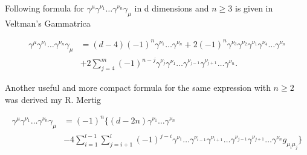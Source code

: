 \documentclass[../FeynCalcManual.tex]{subfiles}
\begin{document}
Following formula for
\(\gamma^\mu \gamma^{\nu_1} \dots \gamma^{\nu_n} \gamma_\mu\) in d
dimensions and \(n\geq 3\) is given in Veltman's Gammatrica

\begin{align}
\gamma^\mu \gamma^{\nu_1} \dots \gamma^{\nu_n} \gamma_\mu &= (d-4)(-1)^n \gamma^{\nu_1} \dots \gamma^{\nu_n} + 2(-1)^n \gamma^{\nu_3} \gamma^{\nu_2} \gamma^{\nu_1} \gamma^{\nu_4}\dots \gamma^{\nu_n} \\
& + 2 \sum_{j=4}^m (-1)^{n-j} \gamma^{\nu_j} \gamma^{\nu_1} \dots \gamma^{\nu_{j-1}} \gamma^{\nu_{j+1}} \dots \gamma^{\nu_{n}}.
\end{align}

Another useful and more compact formula for the same expression with
\(n \geq 2\) was derived my R. Mertig

\begin{align}
\gamma^\mu \gamma^{\nu_1} \dots \gamma^{\nu_n} \gamma_\mu &= (-1)^n \biggl \{ (d-2n) \gamma^{\nu_1} \dots \gamma^{\nu_n} \\
& -4 \sum_{i=1}^{l-1} \sum_{j=i+1}^{l} (-1)^{j-i}  \gamma^{\nu_1} \dots \gamma^{\nu_{i-1}} \gamma^{\nu_{i+1}} \dots \gamma^{\nu_{j-1}} \gamma^{\nu_{j+1}} \dots \gamma^{\nu_n} g_{{\mu_i} {\mu_j}} \biggr \}
\end{align}
\end{document}
